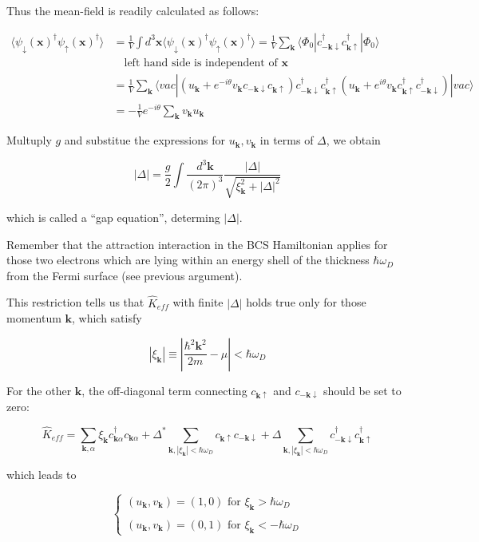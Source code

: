 ﻿\documentclass[twoside]{book}
\numberwithin{equation}{section}
\begin{document}
Thus the mean-field is readily calculated as follows: %

\[\begin{split}
\langle\psi_{\downarrow}(\bm{x})^\dagger\psi_{\uparrow}(\bm{x})^\dagger\rangle &= \frac{1}{V}\int d^3 \bm{x} \langle\psi_{\downarrow}(\bm{x})^\dagger\psi_{\uparrow}(\bm{x})^\dagger\rangle = \frac{1}{V} \sum_{\bm{k}}\langle\Phi_0|c_{-\bm{k}\downarrow}^\dagger c_{\bm{k}\uparrow}^\dagger|\Phi_0\rangle \\
&\quad\text{left hand side is independent of }\bm{x}\\
&= \frac{1}{V}\sum_{\bm{k}}\langle vac|(u_{\bm{k}}+e^{-i\theta}v_{\bm{k}}c_{-\bm{k}\downarrow}c_{\bm{k}\uparrow})c_{-\bm{k}\downarrow}^\dagger c_{\bm{k}\uparrow}^\dagger (u_{\bm{k}}+e^{i\theta}v_{\bm{k}}c_{\bm{k}\uparrow}^\dagger c_{-\bm{k}\downarrow}^\dagger)|vac\rangle\\
&= -\frac{1}{V}e^{-i\theta}\sum_{\bm{k}}v_{\bm{k}}u_{\bm{k}}
\end{split}\]

Multuply $g$ and substitue the expressions for $u_{\bm{k}}, v_{\bm{k}}$ in terms of $\Delta$, we obtain

\[|\Delta| = \frac{g}{2}\int \frac{d^3 \bm{k}}{(2\pi)^3}\frac{|\Delta|}{\sqrt{\xi_{\bm{k}}^2+|\Delta|^2}} \]

which is called a ``gap equation'', determing $|\Delta|$. 

Remember that the attraction interaction in the BCS Hamiltonian applies for those two electrons which are lying within an energy shell of the thickness $\hbar \omega_D$ from the Fermi surface (see previous argument).

This restriction tells us that $\hat{K}_{eff}$ with finite $|\Delta|$ holds true only for those momentum $\bm{k}$, which satisfy

\[|\xi_{\bm{k}}| \equiv |\frac{\hbar^2 \bm{k}^2}{2m}-\mu|<\hbar \omega_D \]

For the other $\bm{k}$, the off-diagonal term connecting $c_{\bm{k}\uparrow}$ and $c_{-\bm{k}\downarrow}$ should be set to zero:

\[\hat{K}_{eff}=\sum_{\bm{k},\alpha}\xi_{\bm{k}}c_{\bm{k}\alpha}^\dagger c_{\bm{k}\alpha}+\Delta^* \sum_{\bm{k},|\xi_{\bm{k}}|<\hbar\omega_D}c_{\bm{k}\uparrow}c_{-\bm{k}\downarrow}+\Delta\sum_{\bm{k},|\xi_{\bm{k}}|<\hbar\omega_D}c_{-\bm{k}\downarrow}^\dagger c_{\bm{k}\uparrow}^\dagger \]

which leads to

\[\begin{cases}
 (u_{\bm{k}},v_{\bm{k}}) = (1,0)\text{ for }\xi_{\bm{k}}>\hbar\omega_D\\
\ \\
(u_{\bm{k}},v_{\bm{k}}) = (0,1)\text{ for }\xi_{\bm{k}}<-\hbar\omega_D
\end{cases}\]
\end{document}
